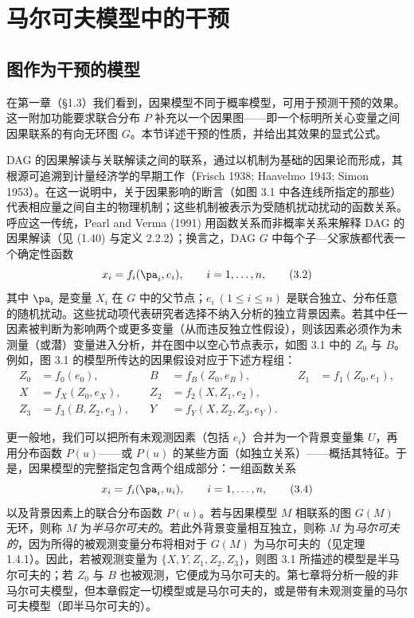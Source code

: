 \section{马尔可夫模型中的干预}

\subsection{图作为干预的模型}

在第一章（\S 1.3）我们看到，因果模型不同于概率模型，可用于预测干预的效果。这一附加功能要求联合分布 $P$ 补充以一个因果图——即一个标明所关心变量之间因果联系的有向无环图 $G$。本节详述干预的性质，并给出其效果的显式公式。

DAG 的因果解读与关联解读之间的联系，通过以机制为基础的因果论而形成，其根源可追溯到计量经济学的早期工作（Frisch 1938; Haavelmo 1943; Simon 1953）。在这一说明中，关于因果影响的断言（如图 3.1 中各连线所指定的那些）代表相应量之间自主的物理机制；这些机制被表示为受随机扰动扰动的函数关系。呼应这一传统，Pearl and Verma (1991) 用函数关系而非概率关系来解释 DAG 的因果解读（见 \textup{(1.40)} 与定义 2.2.2）；换言之，DAG $G$ 中每个子—父家族都代表一个确定性函数
\begin{equation}
x_i = f_i(\pa_i, e_i),\qquad i=1,\dots,n, \tag{3.2}
\end{equation}
其中 $\pa_i$ 是变量 $X_i$ 在 $G$ 中的父节点；$e_i\ (1\le i\le n)$ 是联合独立、分布任意的随机扰动。这些扰动项代表研究者选择不纳入分析的独立背景因素。若其中任一因素被判断为影响两个或更多变量（从而违反独立性假设），则该因素必须作为未测量（或潜）变量进入分析，并在图中以空心节点表示，如图 3.1 中的 $Z_0$ 与 $B$。例如，图 3.1 的模型所传达的因果假设对应于下述方程组：
\begin{equation}
\begin{aligned}
Z_0 &= f_0(e_0), &\quad B &= f_B(Z_0,e_B), &\quad Z_1 &= f_1(Z_0,e_1),\\
X &= f_X(Z_0,e_X), &\quad Z_2 &= f_2(X,Z_1,e_2),\\
Z_3 &= f_3(B,Z_2,e_3), &\quad Y &= f_Y(X,Z_2,Z_3,e_Y).
\end{aligned} \tag{3.3}
\end{equation}

更一般地，我们可以把所有未观测因素（包括 $e_i$）合并为一个背景变量集 $U$，再用分布函数 $P(u)$——或 $P(u)$ 的某些方面（如独立关系）——概括其特征。于是，因果模型的完整指定包含两个组成部分：一组函数关系
\begin{equation}
x_i = f_i(\pa_i, u_i),\qquad i=1,\dots,n, \tag{3.4}
\end{equation}
以及背景因素上的联合分布函数 $P(u)$。若与因果模型 $M$ 相联系的图 $G(M)$ 无环，则称 $M$ 为\emph{半马尔可夫的}。若此外背景变量相互独立，则称 $M$ 为\emph{马尔可夫的}，因为所得的被观测变量分布将相对于 $G(M)$ 为马尔可夫的（见定理 1.4.1）。因此，若被观测变量为 $\{X,Y,Z_1,Z_2,Z_3\}$，则图 3.1 所描述的模型是半马尔可夫的；若 $Z_0$ 与 $B$ 也被观测，它便成为马尔可夫的。第七章将分析一般的非马尔可夫模型，但本章假定一切模型或是马尔可夫的，或是带有未观测变量的马尔可夫模型（即半马尔可夫的）。

